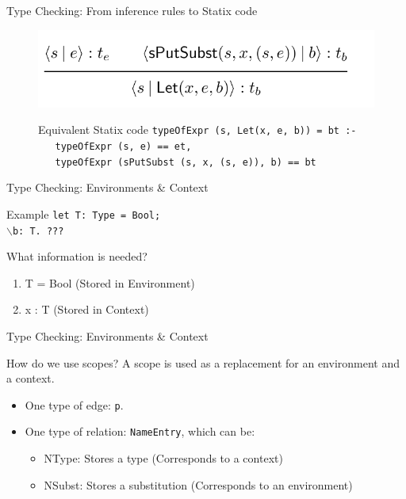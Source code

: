 \documentclass[aspectratio=43]{beamer}
\begin{document}
\begin{frame}[fragile]{Type Checking: From inference rules to Statix code}
	\begin{figure}
		\centering
		\includegraphics[width=0.8\linewidth]{img/screenshot004}
	\end{figure}
	
	\begin{figure}
		\centering
		\begin{exampleblock}{Equivalent Statix code} 
			\texttt{typeOfExpr (s, Let(x, e, b)) = bt :-\\
				\,\, typeOfExpr (s, e) == et, \\
				\,\, typeOfExpr (sPutSubst (s, x, (s, e)), b) == bt}
		\end{exampleblock}
	\end{figure}
\end{frame}

\begin{frame}[fragile]{Type Checking: Environments \& Context}
	\begin{exampleblock}{Example}
		\texttt{let T: Type = Bool;\\
			$\backslash$b: T. ???
		}
	\end{exampleblock}
	
	\begin{block}{What information is needed?}
		\begin{enumerate}
			\item T = Bool (Stored in Environment)
			\item x : T (Stored in Context)
		\end{enumerate}
	\end{block}
\end{frame}


\begin{frame}[fragile]{Type Checking: Environments \& Context}
	\begin{block}{How do we use scopes?}
		A scope is used as a replacement for an environment and a context.\\
		\begin{itemize}
			\item One type of edge: \verb|p|.
			\item One type of relation: \verb|NameEntry|, which can be:
				\begin{itemize}
					\item NType: Stores a type (Corresponds to a context)
					\item NSubst: Stores a substitution (Corresponds to an environment)
				\end{itemize}
		\end{itemize}
	\end{block}
\end{frame}
\end{document}
